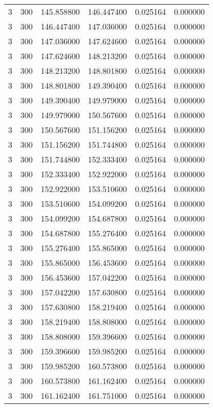 \begin{longtable}{rrrrrr}
3 & 300 & 145.858800 & 146.447400 & 0.025164 & 0.000000 \\
3 & 300 & 146.447400 & 147.036000 & 0.025164 & 0.000000 \\
3 & 300 & 147.036000 & 147.624600 & 0.025164 & 0.000000 \\
3 & 300 & 147.624600 & 148.213200 & 0.025164 & 0.000000 \\
3 & 300 & 148.213200 & 148.801800 & 0.025164 & 0.000000 \\
3 & 300 & 148.801800 & 149.390400 & 0.025164 & 0.000000 \\
3 & 300 & 149.390400 & 149.979000 & 0.025164 & 0.000000 \\
3 & 300 & 149.979000 & 150.567600 & 0.025164 & 0.000000 \\
3 & 300 & 150.567600 & 151.156200 & 0.025164 & 0.000000 \\
3 & 300 & 151.156200 & 151.744800 & 0.025164 & 0.000000 \\
3 & 300 & 151.744800 & 152.333400 & 0.025164 & 0.000000 \\
3 & 300 & 152.333400 & 152.922000 & 0.025164 & 0.000000 \\
3 & 300 & 152.922000 & 153.510600 & 0.025164 & 0.000000 \\
3 & 300 & 153.510600 & 154.099200 & 0.025164 & 0.000000 \\
3 & 300 & 154.099200 & 154.687800 & 0.025164 & 0.000000 \\
3 & 300 & 154.687800 & 155.276400 & 0.025164 & 0.000000 \\
3 & 300 & 155.276400 & 155.865000 & 0.025164 & 0.000000 \\
3 & 300 & 155.865000 & 156.453600 & 0.025164 & 0.000000 \\
3 & 300 & 156.453600 & 157.042200 & 0.025164 & 0.000000 \\
3 & 300 & 157.042200 & 157.630800 & 0.025164 & 0.000000 \\
3 & 300 & 157.630800 & 158.219400 & 0.025164 & 0.000000 \\
3 & 300 & 158.219400 & 158.808000 & 0.025164 & 0.000000 \\
3 & 300 & 158.808000 & 159.396600 & 0.025164 & 0.000000 \\
3 & 300 & 159.396600 & 159.985200 & 0.025164 & 0.000000 \\
3 & 300 & 159.985200 & 160.573800 & 0.025164 & 0.000000 \\
3 & 300 & 160.573800 & 161.162400 & 0.025164 & 0.000000 \\
3 & 300 & 161.162400 & 161.751000 & 0.025164 & 0.000000 \\

\end{longtable}
